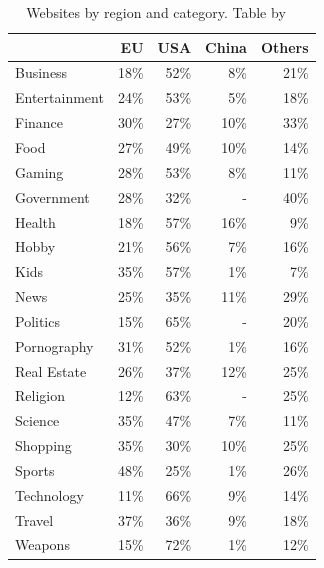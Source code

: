 \begin{table}
    \begin{tabular}{ l  r  r  r  r}
        \hline
        & EU & USA & China & Others\\
        \hline
        Business & 18\% & 52\% & 8\% & 21\%\\
        Entertainment & 24\% & 53\% & 5\% & 18\%\\
        Finance & 30\% & 27\% & 10\% & 33\%\\
        Food & 27\% & 49\% & 10\% & 14\%\\
        Gaming & 28\% & 53\% & 8\% & 11\%\\
        Government & 28\% & 32\% & - & 40\%\\
        Health & 18\% & 57\% & 16\% & 9\%\\
        Hobby & 21\% & 56\% & 7\% & 16\%\\
        Kids & 35\% & 57\% & 1\% & 7\%\\
        News & 25\% & 35\% & 11\% & 29\%\\
        Politics & 15\% & 65\% & - & 20\%\\
        Pornography & 31\% & 52\% & 1\% & 16\%\\
        Real Estate & 26\% & 37\% & 12\% & 25\%\\
        Religion & 12\% & 63\% & - & 25\%\\
        Science & 35\% & 47\% & 7\% & 11\%\\
        Shopping & 35\% & 30\% & 10\% & 25\%\\
        Sports & 48\% & 25\% & 1\% & 26\%\\
        Technology & 11\% & 66\% & 9\% & 14\%\\
        Travel & 37\% & 36\% & 9\% & 18\%\\
        Weapons & 15\% & 72\% & 1\% & 12\%\\
        \hline
    \end{tabular}
    \caption{Websites by region and category. Table by \citeauthor{sanchez2019can}~\cite[Tab.~1]{sanchez2019can}}
    \label{tab:websites}
\end{table}

